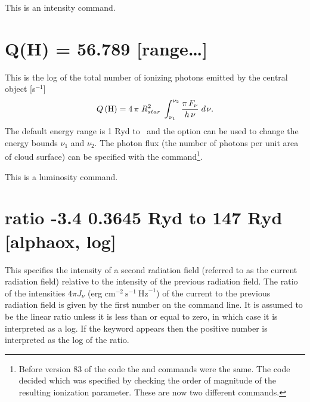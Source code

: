 This is an intensity command.

\section{Q(H) = 56.789 [range\dots]}

This is the log of the total number of ionizing photons emitted by the
central object [s$^{-1}$]
\begin{equation}
Q\left( {\mathrm{H}} \right) = 4\,\pi \;R_{star}^2 \;\int_{\nu _1 }^{\nu _2
} {\frac{{\pi \,F_\nu  }}{{h\,\nu }}\;d{\kern 1pt} \nu } . %
\end{equation}
The default energy range is 1 Ryd to \egamry\
and the  option
can be used to change the energy bounds $\nu_1$ and $\nu_2$.
The photon flux (the
number of photons per unit area of cloud surface) can be specified with
the  command\footnote{Before version 83
of the code the \cdCommand{phi(H)} and  commands were the
same.
The code decided which was specified by checking the order of
magnitude of the resulting ionization parameter.
These are now two different commands.}.

This is a luminosity command.

\section{ratio -3.4 0.3645 Ryd to 147 Ryd [alphaox, log]}

This specifies the intensity of a second radiation field
(referred to as the current radiation field) relative to the
intensity of the previous
radiation field.
The ratio of the intensities
$4\pi J_\nu$ (erg cm$^{-2}\ \mathrm{s}^{-1}\ \mathrm{Hz}^{-1}$)
of the current to the previous radiation field is given
by the first number on the command line.
It is assumed to be the linear ratio unless it is
less than or equal to zero, in which case it is interpreted as a log.
If the keyword \cdCommand{log} appears then the
positive number is interpreted
as the log of the ratio.

